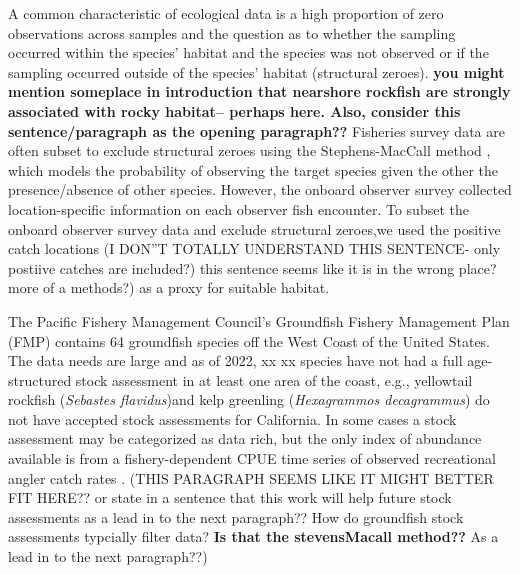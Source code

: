 \documentclass[
  authoryear,
  preprint,
  3p]{elsarticle}
\begin{document}
A common characteristic of ecological data is a high proportion of zero
observations across samples and the question as to whether the sampling
occurred within the species' habitat and the species was not observed or
if the sampling occurred outside of the species' habitat (structural
zeroes). \textbf{you might mention someplace in introduction that
nearshore rockfish are strongly associated with rocky habitat-- perhaps
here. Also, consider this sentence/paragraph as the opening paragraph??}
Fisheries survey data are often subset to exclude structural zeroes
using the Stephens-MacCall method \citeyearpar{Stephens:2004:MAS}, which
models the probability of observing the target species given the other
the presence/absence of other species. However, the onboard observer
survey collected location-specific information on each observer fish
encounter. To subset the onboard observer survey data and exclude
structural zeroes,we used the positive catch locations (I DON''T TOTALLY
UNDERSTAND THIS SENTENCE- only postiive catches are included?) this
sentence seems like it is in the wrong place? more of a methods?) as a
proxy for suitable habitat.

The Pacific Fishery Management Council's Groundfish Fishery Management
Plan (FMP) contains 64 groundfish species off the West Coast of the
United States. The data needs are large and as of 2022, xx xx species
have not had a full age-structured stock assessment in at least one area
of the coast, e.g., yellowtail rockfish (\emph{Sebastes flavidus})and
kelp greenling (\emph{Hexagrammos decagrammus}) do not have accepted
stock assessments for California. In some cases a stock assessment may
be categorized as data rich, but the only index of abundance available
is from a fishery-dependent CPUE time series of observed recreational
angler catch rates \citep{Cope:2013:ISC}. (THIS PARAGRAPH SEEMS LIKE IT
MIGHT BETTER FIT HERE?? or state in a sentence that this work will help
future stock assessments as a lead in to the next paragraph?? How do
groundfish stock assessments typcially filter data? \textbf{Is that the
stevensMacall method??} As a lead in to the next paragraph??)
\end{document}
